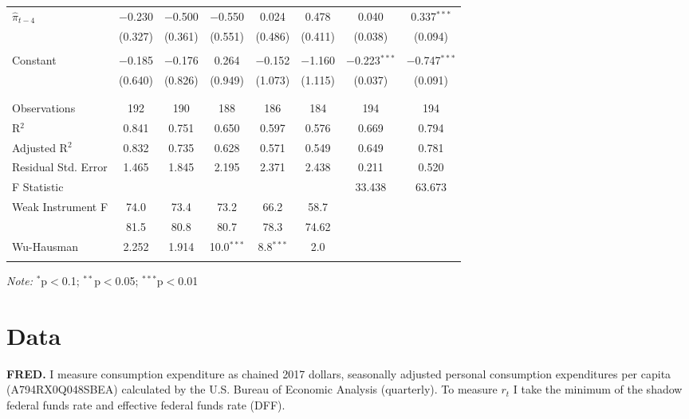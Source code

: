 \documentclass[12pt]{article}
\numberwithin{equation}{section}
\begin{document}
\begin{table}[!htbp]
\begin{threeparttable}
\begin{tabular}{@{\extracolsep{2pt}}lccccccc}
    $\hat\pi_{t-4}$  & $-$0.230 & $-$0.500 & $-$0.550 & 0.024 & 0.478 & 0.040 & 0.337$^{***}$ \\ 
    & (0.327) & (0.361) & (0.551) & (0.486) & (0.411) & (0.038) & (0.094) \\ 
    & & & & & & \\ 
   Constant  & $-$0.185 & $-$0.176 & 0.264 & $-$0.152 & $-$1.160 & $-$0.223$^{***}$ & $-$0.747$^{***}$ \\ 
   & (0.640) & (0.826) & (0.949) & (1.073) & (1.115) & (0.037) & (0.091) \\ 
    & & & & & & \\ 
  \hline \\[-1.8ex] 
  Observations & 192 & 190 & 188 & 186 & 184 & 194 & 194 \\ 
  R$^{2}$ & 0.841 & 0.751 & 0.650 & 0.597 & 0.576 & 0.669 & 0.794 \\ 
  Adjusted R$^{2}$ & 0.832 & 0.735 & 0.628 & 0.571 & 0.549 & 0.649 & 0.781 \\ 
  Residual Std. Error & 1.465 & 1.845 & 2.195 & 2.371 & 2.438 & 0.211 & 0.520 \\ 
  F Statistic &  &  &  &  &  & 33.438& 63.673 \\ 
  Weak Instrument F & 74.0&73.4 &73.2 & 66.2& 58.7\\
    &  81.5 &80.8& 80.7 &78.3 & 74.62\\
  Wu-Hausman & 2.252 & 1.914& 10.0$^{***}$&8.8$^{***}$& 2.0\\
  \hline 
  \hline \\[-1.8ex] 
  \end{tabular} 
  \begin{tablenotes}[flushleft]
\item[] \textit{Note:}  $^{*}$p$<$0.1; $^{**}$p$<$0.05; $^{***}$p$<$0.01
\end{tablenotes}
\end{threeparttable}
  \end{table} 


\newpage

\section{Data} 

\noindent\textbf{FRED.} I measure consumption expenditure as chained 2017 dollars, seasonally adjusted personal consumption expenditures per capita (A794RX0Q048SBEA) calculated by the U.S. Bureau of Economic Analysis (quarterly). 
To measure $r_t$ I take the minimum of the shadow federal funds rate \citep{WuXia2016} and effective federal funds rate (DFF).
\end{document}
